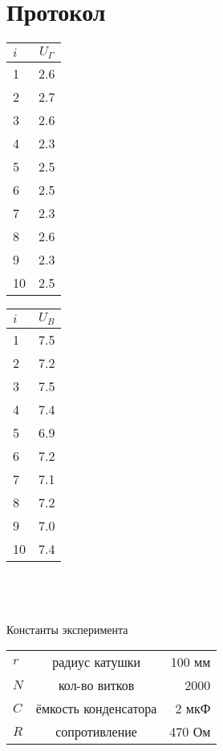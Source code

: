 \section*{Протокол}

\begin{tabular}{|l|c|}
	\hline
	$ i $ & $ U_\Gamma $ \\
	\hline
	1 & 2.6 \\
	\hline
	2 & 2.7 \\
	\hline
	3 & 2.6 \\
	\hline
	4 & 2.3 \\
	\hline
	5 & 2.5 \\
	\hline
	6 & 2.5 \\
	\hline
	7 & 2.3 \\
	\hline
	8 & 2.6 \\
	\hline
	9 & 2.3 \\
	\hline
	10 & 2.5 \\
	\hline
\end{tabular}
\quad
\begin{tabular}{|l|c|}
	\hline
	$ i $ & $ U_B $ \\
	\hline
	1 & 7.5 \\
	\hline
	2 & 7.2 \\
	\hline
	3 & 7.5 \\
	\hline
	4 & 7.4 \\
	\hline
	5 & 6.9 \\
	\hline
	6 & 7.2 \\
	\hline
	7 & 7.1 \\
	\hline
	8 & 7.2 \\
	\hline
	9 & 7.0 \\
	\hline
	10 & 7.4 \\
	\hline
\end{tabular}
\\
\\
\\

Константы эксперимента

\begin{tabular}{|lcr|}
	\hline
	$ r $ & радиус катушки & 100 мм\\
	$ N $ & кол-во витков & 2000\\
	$ C $ & ёмкость конденсатора & 2 мкФ\\
	$ R $ & сопротивление & 470 Ом\\
	\hline
\end{tabular}